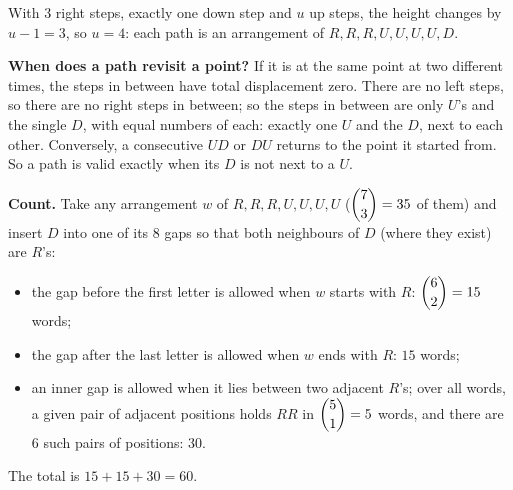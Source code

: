 With $3$ right steps, exactly one down step and $u$ up steps, the height changes by $u-1=3$, so $u=4$: each path is an arrangement of $R,R,R,U,U,U,U,D$.

\textbf{When does a path revisit a point?} If it is at the same point at two different times, the steps in between have total displacement zero. There are no left steps, so there are no right steps in between; so the steps in between are only $U$'s and the single $D$, with equal numbers of each: exactly one $U$ and the $D$, next to each other. Conversely, a consecutive $UD$ or $DU$ returns to the point it started from. So a path is valid exactly when its $D$ is not next to a $U$.

\textbf{Count.} Take any arrangement $w$ of $R,R,R,U,U,U,U$ ($\dbinom73=35$ of them) and insert $D$ into one of its $8$ gaps so that both neighbours of $D$ (where they exist) are $R$'s:
\begin{itemize}
\item the gap before the first letter is allowed when $w$ starts with $R$: $\dbinom62=15$ words;
\item the gap after the last letter is allowed when $w$ ends with $R$: $15$ words;
\item an inner gap is allowed when it lies between two adjacent $R$'s; over all words, a given pair of adjacent positions holds $RR$ in $\dbinom51=5$ words, and there are $6$ such pairs of positions: $30$.
\end{itemize}
The total is $15+15+30=\boxed{60}$.
